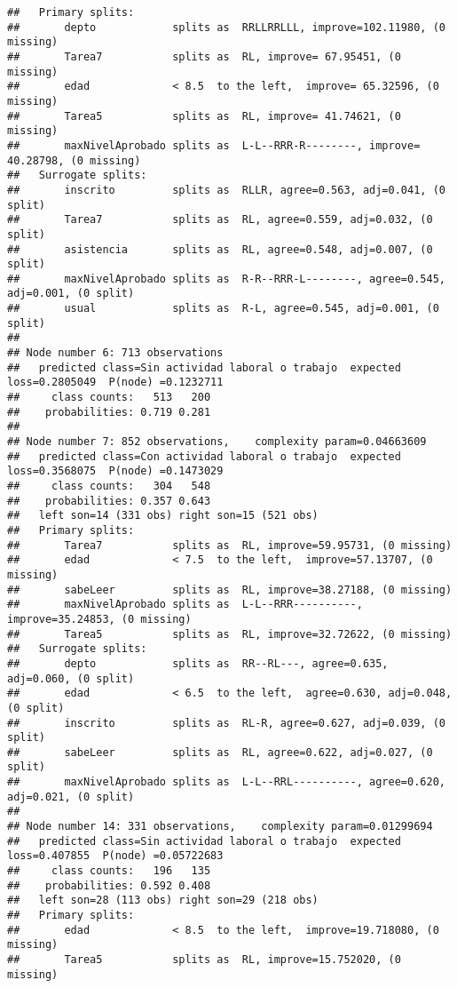 \documentclass[
]{article}
\begin{document}
\begin{verbatim}
##   Primary splits:
##       depto            splits as  RRLLRRLLL, improve=102.11980, (0 missing)
##       Tarea7           splits as  RL, improve= 67.95451, (0 missing)
##       edad             < 8.5  to the left,  improve= 65.32596, (0 missing)
##       Tarea5           splits as  RL, improve= 41.74621, (0 missing)
##       maxNivelAprobado splits as  L-L--RRR-R--------, improve= 40.28798, (0 missing)
##   Surrogate splits:
##       inscrito         splits as  RLLR, agree=0.563, adj=0.041, (0 split)
##       Tarea7           splits as  RL, agree=0.559, adj=0.032, (0 split)
##       asistencia       splits as  RL, agree=0.548, adj=0.007, (0 split)
##       maxNivelAprobado splits as  R-R--RRR-L--------, agree=0.545, adj=0.001, (0 split)
##       usual            splits as  R-L, agree=0.545, adj=0.001, (0 split)
## 
## Node number 6: 713 observations
##   predicted class=Sin actividad laboral o trabajo  expected loss=0.2805049  P(node) =0.1232711
##     class counts:   513   200
##    probabilities: 0.719 0.281 
## 
## Node number 7: 852 observations,    complexity param=0.04663609
##   predicted class=Con actividad laboral o trabajo  expected loss=0.3568075  P(node) =0.1473029
##     class counts:   304   548
##    probabilities: 0.357 0.643 
##   left son=14 (331 obs) right son=15 (521 obs)
##   Primary splits:
##       Tarea7           splits as  RL, improve=59.95731, (0 missing)
##       edad             < 7.5  to the left,  improve=57.13707, (0 missing)
##       sabeLeer         splits as  RL, improve=38.27188, (0 missing)
##       maxNivelAprobado splits as  L-L--RRR----------, improve=35.24853, (0 missing)
##       Tarea5           splits as  RL, improve=32.72622, (0 missing)
##   Surrogate splits:
##       depto            splits as  RR--RL---, agree=0.635, adj=0.060, (0 split)
##       edad             < 6.5  to the left,  agree=0.630, adj=0.048, (0 split)
##       inscrito         splits as  RL-R, agree=0.627, adj=0.039, (0 split)
##       sabeLeer         splits as  RL, agree=0.622, adj=0.027, (0 split)
##       maxNivelAprobado splits as  L-L--RRL----------, agree=0.620, adj=0.021, (0 split)
## 
## Node number 14: 331 observations,    complexity param=0.01299694
##   predicted class=Sin actividad laboral o trabajo  expected loss=0.407855  P(node) =0.05722683
##     class counts:   196   135
##    probabilities: 0.592 0.408 
##   left son=28 (113 obs) right son=29 (218 obs)
##   Primary splits:
##       edad             < 8.5  to the left,  improve=19.718080, (0 missing)
##       Tarea5           splits as  RL, improve=15.752020, (0 missing)

\end{verbatim}
\end{document}
